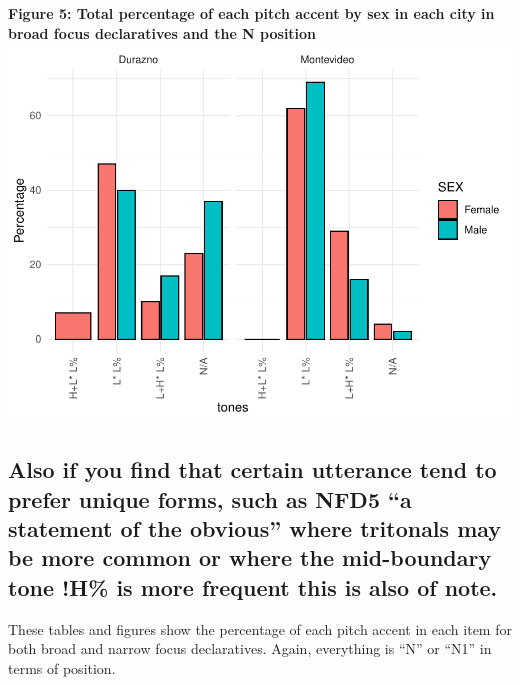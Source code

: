 \documentclass[
  man]{apa6}
\begin{document}
\textbf{Figure 5: Total percentage of each pitch accent by sex in each city in broad focus declaratives and the N position}
\includegraphics{main_files/figure-latex/unnamed-chunk-13-1.pdf}

\hypertarget{also-if-you-find-that-certain-utterance-tend-to-prefer-unique-forms-such-as-nfd5-a-statement-of-the-obvious-where-tritonals-may-be-more-common-or-where-the-mid-boundary-tone-h-is-more-frequent-this-is-also-of-note.}{%
\subsection{Also if you find that certain utterance tend to prefer unique forms, such as NFD5 ``a statement of the obvious'' where tritonals may be more common or where the mid-boundary tone !H\% is more frequent this is also of note.}\label{also-if-you-find-that-certain-utterance-tend-to-prefer-unique-forms-such-as-nfd5-a-statement-of-the-obvious-where-tritonals-may-be-more-common-or-where-the-mid-boundary-tone-h-is-more-frequent-this-is-also-of-note.}}

These tables and figures show the percentage of each pitch accent in each item for both broad and narrow focus declaratives. Again, everything is ``N'' or ``N1'' in terms of position.
\end{document}

